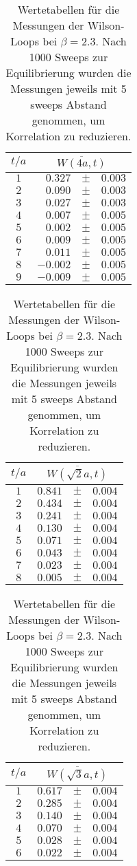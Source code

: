 \begin{table}[htbp]
\begin{tabular}{crcl} 
\hline
    $t/a$ &\multicolumn{3}{c}{$\overline{W(4a,t)}$} \\ 
\hline
$1$ &	$0.327$ & 	 $\pm$ & 	 $0.003$\\
$2$ &	$0.090$ & 	 $\pm$ & 	 $0.003$\\
$3$ &	$0.027$ & 	 $\pm$ & 	 $0.003$\\
$4$ &	$0.007$ & 	 $\pm$ & 	 $0.005$\\
$5$ &	$0.002$ & 	 $\pm$ & 	 $0.005$\\
$6$ &	$0.009$ & 	 $\pm$ & 	 $0.005$\\
$7$ &	$0.011$ & 	 $\pm$ & 	 $0.005$\\
$8$ &	$-0.002$ & 	 $\pm$ & 	 $0.005$\\
$9$ &	$-0.009$ & 	 $\pm$ & 	 $0.005$\\
\hline
\end{tabular}
    \hspace{1cm}
\begin{tabular}{crcl} 
\hline
    $t/a$ &\multicolumn{3}{c}{$\overline{W(\sqrt{2}a,t)}$} \\ 
\hline
$1$ &	$0.841$ & 	 $\pm$ & 	 $0.004$\\
$2$ &	$0.434$ & 	 $\pm$ & 	 $0.004$\\
$3$ &	$0.241$ & 	 $\pm$ & 	 $0.004$\\
$4$ &	$0.130$ & 	 $\pm$ & 	 $0.004$\\
$5$ &	$0.071$ & 	 $\pm$ & 	 $0.004$\\
$6$ &	$0.043$ & 	 $\pm$ & 	 $0.004$\\
$7$ &	$0.023$ & 	 $\pm$ & 	 $0.004$\\
$8$ &	$0.005$ & 	 $\pm$ & 	 $0.004$\\
\hline
\end{tabular}
    \hspace{1cm}
\begin{tabular}{crcl} 
\hline
    $t/a$ &\multicolumn{3}{c}{$\overline{W(\sqrt{3}a,t)}$} \\ 
\hline
$1$ &	$0.617$ & 	 $\pm$ & 	 $0.004$\\
$2$ &	$0.285$ & 	 $\pm$ & 	 $0.004$\\
$3$ &	$0.140$ & 	 $\pm$ & 	 $0.004$\\
$4$ &	$0.070$ & 	 $\pm$ & 	 $0.004$\\
$5$ &	$0.028$ & 	 $\pm$ & 	 $0.004$\\
$6$ &	$0.022$ & 	 $\pm$ & 	 $0.004$\\
\hline
\end{tabular}
    \caption{Wertetabellen für die Messungen der Wilson-Loops bei $\beta = 2.3$.
    Nach 1000 Sweeps zur Equilibrierung wurden die Messungen jeweils mit 5 sweeps
    Abstand genommen, um Korrelation zu reduzieren.}
    \label{tab:wilsonBeta23b}
\end{table}

